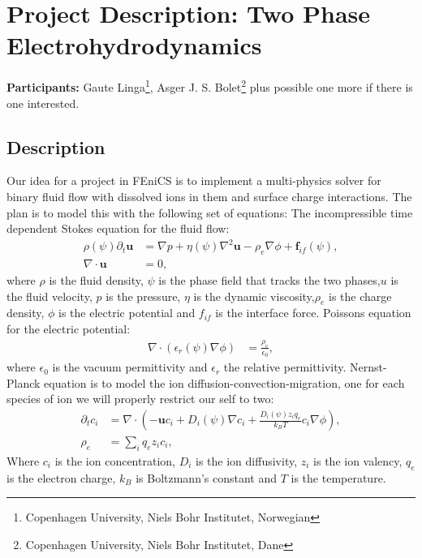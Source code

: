 \documentclass[a4paper,10pt]{article}
\numberwithin{equation}{section}
\numberwithin{figure}{section}
\begin{document}
\section{Project Description: Two Phase Electrohydrodynamics}
\textbf{Participants:} Gaute Linga\footnote{Copenhagen University, Niels Bohr Institutet, Norwegian}, Asger J. S. Bolet\footnote{Copenhagen University, Niels Bohr Institutet, Dane} plus possible one more if there is one interested.

\subsection{Description}
Our idea for a project in FEniCS is to implement a multi-physics solver for binary fluid flow with dissolved ions in them and surface charge interactions. The plan is to model this with the following set of equations:\newline 
The incompressible time dependent Stokes equation for the fluid flow:
\begin{align}
\rho(\psi) \partial_t \mathbf{u}  &=  \nabla p +\eta(\psi) \nabla^2 \mathbf{u} -  \rho_e  \nabla \phi + \mathbf{f}_{if}(\psi),  \\  
\nabla \cdot\mathbf{u} &= 0,
\end{align}
where $\rho$ is the fluid density, $\psi$ is the phase field that tracks the two phases,$u$ is the fluid velocity, $p$ is the pressure, $\eta$ is the dynamic viscosity,$\rho_e$ is the charge density, $\phi$ is the electric potential and  
$f_{if}$ is the interface force. \newline
Poissons equation for the electric potential: 
\begin{align}
\nabla\cdot\left(\epsilon_r(\psi)\nabla\phi\right) &= \frac{\rho_e}{\epsilon_0 },
\end{align}
where $\epsilon_0$ is the vacuum permittivity and $\epsilon_r$ the relative permittivity. \newline 
Nernst-Planck equation is to model the ion diffusion-convection-migration, one for each species of ion we will properly restrict our self to two:
\begin{align}
\partial_t c_i  &=  \nabla  \cdot  \left( - \mathbf{u} c_i  + D_i(\psi) \nabla c_i  +   \frac{D_i(\psi) z_i q_e}{k_B T} c_i \nabla \phi \right), \\
\rho_e &= \sum_i q_e z_i c_i, 
\end{align}
Where $c_i$ is the ion concentration, $D_i$ is the ion diffusivity, $z_i$ is the ion valency, $q_e$ is the electron charge, $k_B$ is Boltzmann's constant and $T$ is the temperature.\newline     
\end{document}
